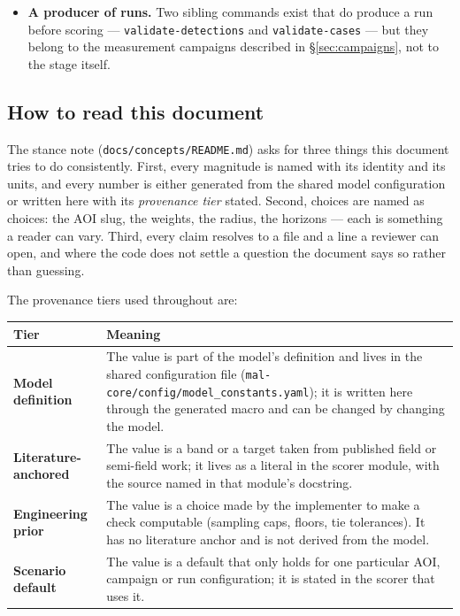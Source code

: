 \documentclass[11pt,a4paper]{article}
\newcommand{\code}[1]{\texttt{#1}}
\begin{document}
\begin{itemize}
      its duplicated scorers were deleted, and the base module says so
      (\code{mal-core/src/mal\_core/scoring/scorers/base.py:1-6}). The
      thresholds that used to live there are now inlined in each scorer
      module, or read from the shared model configuration where they belong
      to the model.
\item \textbf{A producer of runs.} Two sibling commands exist that do
      produce a run before scoring --- \code{validate-detections} and
      \code{validate-cases} --- but they belong to the measurement
      campaigns described in \S\ref{sec:campaigns}, not to the stage itself.
\end{itemize}

\subsection{How to read this document}

The stance note (\code{docs/concepts/README.md}) asks for three things this
document tries to do consistently. First, every magnitude is named with its
identity and its units, and every number is either generated from the shared
model configuration or written here with its \emph{provenance tier} stated.
Second, choices are named as choices: the AOI slug, the weights, the radius,
the horizons --- each is something a reader can vary. Third, every claim
resolves to a file and a line a reviewer can open, and where the code does
not settle a question the document says so rather than guessing.

The provenance tiers used throughout are:

\begin{longtable}{@{}p{2.6cm}p{11.4cm}@{}}
\toprule
Tier & Meaning \\
\midrule
\endhead
\textbf{Model definition} & The value is part of the model's definition and
lives in the shared configuration file
(\code{mal-core/config/model\_constants.yaml}); it is written here through the
generated macro \code{\string\mskey} and can be changed by changing the
model. \\
\textbf{Literature-anchored} & The value is a band or a target taken from
published field or semi-field work; it lives as a literal in the scorer
module, with the source named in that module's docstring. \\
\textbf{Engineering prior} & The value is a choice made by the implementer
to make a check computable (sampling caps, floors, tie tolerances). It has
no literature anchor and is not derived from the model. \\
\textbf{Scenario default} & The value is a default that only holds for one
particular AOI, campaign or run configuration; it is stated in the scorer
that uses it. \\
\bottomrule
\end{longtable}
\end{document}
